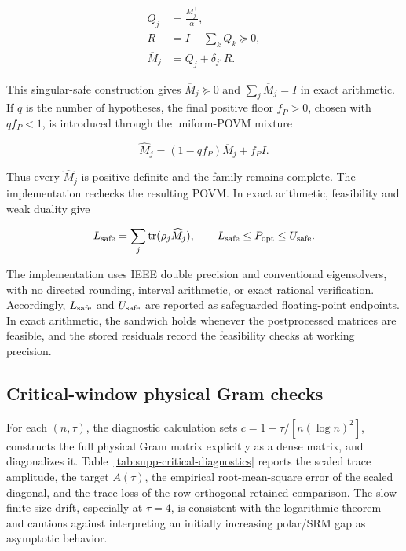 \begin{equation}\label{eq:primal-normalization}
 \begin{aligned}
  Q_j&=\frac{M_j^+}{\alpha},\\
  R&=I-\sum_kQ_k\succeq0,\\
  \overline M_j&=Q_j+\delta_{j1}R.
 \end{aligned}
\end{equation}

This singular-safe construction gives \(\overline M_j\succeq0\) and
\(\sum_j\overline M_j=I\) in exact arithmetic. If \(q\) is the number of
hypotheses, the final positive floor \(f_P>0\), chosen with \(qf_P<1\), is
introduced through the uniform-POVM mixture

\begin{equation}\label{eq:primal-strict-mixture}
 \widehat M_j=(1-qf_P)\overline M_j+f_PI.
\end{equation}

Thus every \(\widehat M_j\) is positive definite and the family remains
complete. The implementation rechecks the resulting POVM. In exact arithmetic,
feasibility and weak duality give

\begin{equation}\label{eq:safe-primal-bound}
L_{\rm safe}=\sum_j\operatorname{tr}(\rho_j\widehat M_j),\qquad
L_{\rm safe}\le P_{\rm opt}\le U_{\rm safe}.
\end{equation}

The implementation uses IEEE double precision and conventional eigensolvers,
with no directed rounding, interval arithmetic, or exact rational
verification. Accordingly, \(L_{\rm safe}\) and \(U_{\rm safe}\) are reported
as safeguarded floating-point endpoints. In exact arithmetic, the sandwich
holds whenever the postprocessed matrices are feasible, and the stored
residuals record the feasibility checks at working precision.

\subsection{Critical-window physical Gram checks}

For each \((n,\tau)\), the diagnostic calculation sets
\(c=1-\tau/[n(\log n)^2]\), constructs the full physical Gram matrix explicitly
as a dense matrix, and diagonalizes it.
Table~\ref{tab:supp-critical-diagnostics} reports the scaled
trace amplitude, the target \(A(\tau)\), the empirical root-mean-square error
of the scaled diagonal, and the trace loss of the row-orthogonal retained
comparison. The slow finite-size drift, especially at \(\tau=4\), is
consistent with the logarithmic theorem and cautions against interpreting an
initially increasing polar/SRM gap as asymptotic behavior.


